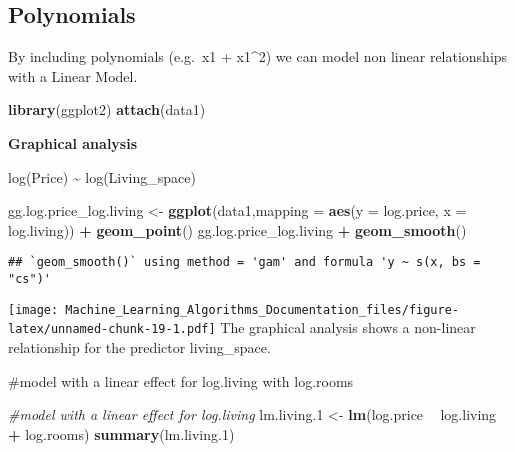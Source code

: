 \documentclass[
]{article}
\newenvironment{Shaded}{\begin{snugshade}}{\end{snugshade}}
\newcommand{\CommentTok}[1]{\textcolor[rgb]{0.56,0.35,0.01}{\textit{#1}}}
\newcommand{\DataTypeTok}[1]{\textcolor[rgb]{0.13,0.29,0.53}{#1}}
\newcommand{\FloatTok}[1]{\textcolor[rgb]{0.00,0.00,0.81}{#1}}
\newcommand{\KeywordTok}[1]{\textcolor[rgb]{0.13,0.29,0.53}{\textbf{#1}}}
\newcommand{\NormalTok}[1]{#1}
\newcommand{\OperatorTok}[1]{\textcolor[rgb]{0.81,0.36,0.00}{\textbf{#1}}}
\newcommand{\StringTok}[1]{\textcolor[rgb]{0.31,0.60,0.02}{#1}}
\begin{document}
\hypertarget{polynomials}{%
\subsection{Polynomials}\label{polynomials}}

By including polynomials (e.g.~x1 + x1\^{}2) we can model non linear
relationships with a Linear Model.

\begin{Shaded}
\begin{Highlighting}[]
\KeywordTok{library}\NormalTok{(ggplot2)}
\KeywordTok{attach}\NormalTok{(data1)}
\end{Highlighting}
\end{Shaded}

\textbf{Graphical analysis}

log(Price) \textasciitilde{} log(Living\_space)

\begin{Shaded}
\begin{Highlighting}[]
\NormalTok{gg.log.price_log.living <-}\StringTok{ }\KeywordTok{ggplot}\NormalTok{(data1,}\DataTypeTok{mapping =} \KeywordTok{aes}\NormalTok{(}\DataTypeTok{y =}\NormalTok{ log.price, }\DataTypeTok{x =}\NormalTok{ log.living)) }\OperatorTok{+}\StringTok{ }\KeywordTok{geom_point}\NormalTok{()}
\NormalTok{gg.log.price_log.living }\OperatorTok{+}\StringTok{ }\KeywordTok{geom_smooth}\NormalTok{()}
\end{Highlighting}
\end{Shaded}

\begin{verbatim}
## `geom_smooth()` using method = 'gam' and formula 'y ~ s(x, bs = "cs")'
\end{verbatim}

\texttt{[image: Machine\_Learning\_Algorithms\_Documentation\_files/figure-latex/unnamed-chunk-19-1.pdf]}
The graphical analysis shows a non-linear relationship for the predictor
living\_space.

\#model with a linear effect for log.living with log.rooms

\begin{Shaded}
\begin{Highlighting}[]
\CommentTok{#model with a linear effect for log.living}
\NormalTok{lm.living}\FloatTok{.1}\NormalTok{ <-}\StringTok{ }\KeywordTok{lm}\NormalTok{(log.price }\OperatorTok{~}\StringTok{ }\NormalTok{log.living }\OperatorTok{+}\StringTok{ }\NormalTok{log.rooms)}
\KeywordTok{summary}\NormalTok{(lm.living}\FloatTok{.1}\NormalTok{)}
\end{Highlighting}
\end{Shaded}
\end{document}
